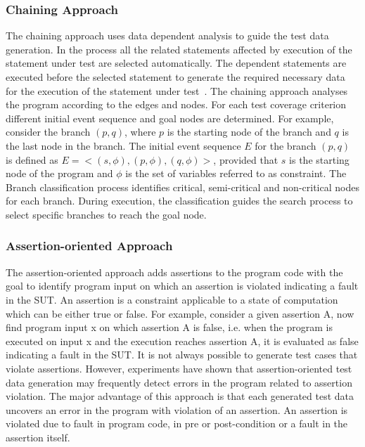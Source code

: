 \subsubsection{Chaining Approach}
The chaining approach uses data dependent analysis to guide the test data generation. In the process all the related statements affected by execution of the statement under test are selected automatically. The dependent statements are executed before the selected statement to generate the required necessary data for the execution of the statement under test~\cite{ferguson1996chaining}. The chaining approach analyses the program according to the edges and nodes. For each test coverage criterion different initial event sequence and goal nodes are determined. For example, consider  the branch $(p, q)$, where $p$ is  the starting node of the branch and $q$ is the last node in the branch. The initial event sequence $E$ for the branch $(p, q)$ is defined as $E =< (s,\phi), (p,\phi),(q,\phi) >$, provided that $s$ is the starting node of the program and $\phi$ is the set of variables referred to as constraint. The Branch classification process identifies critical, semi-critical and non-critical nodes for each branch. During execution, the classification guides the search process to select specific branches to reach the goal node.  

\subsubsection{Assertion-oriented Approach}
The assertion-oriented approach adds assertions to the program code with the goal to identify program input on which an assertion is violated indicating a fault in the SUT. An assertion is a constraint applicable to a state of computation which can be either true or false. For example, consider a given assertion A, now find program input x on which assertion A is false, i.e. when the program is executed on input x and the execution reaches assertion A, it is evaluated as false indicating a fault in the SUT. It is not always possible to generate test cases that violate assertions. However, experiments have shown that assertion-oriented test data generation may frequently detect errors in the program related to assertion violation. The major advantage of this approach is that each generated test data uncovers an error in the program with violation of an assertion. An assertion is violated due to fault in program code, in pre or post-condition or a fault in the assertion itself.

